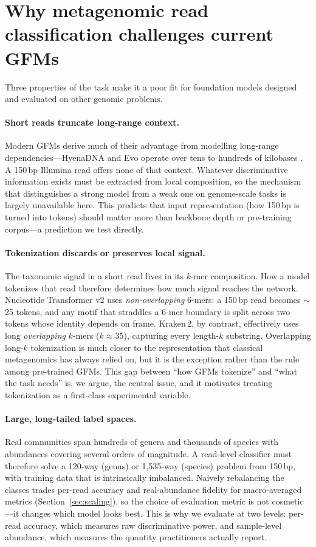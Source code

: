 \section{Why metagenomic read classification challenges current GFMs}
\label{sec:challenges}

Three properties of the task make it a poor fit for foundation models designed
and evaluated on other genomic problems.

\paragraph{Short reads truncate long-range context.}
Modern GFMs derive much of their advantage from modelling long-range
dependencies---HyenaDNA and Evo operate over tens to hundreds of kilobases
\citep{Nguyen2023hyena,Nguyen2024,Brixi2025}. A 150\,bp Illumina read offers
none of that context. Whatever discriminative information exists must be
extracted from local composition, so the mechanism that distinguishes a strong
model from a weak one on genome-scale tasks is largely unavailable here. This
predicts that input representation (how 150\,bp is turned into tokens) should
matter more than backbone depth or pre-training corpus---a prediction we test
directly.

\paragraph{Tokenization discards or preserves local signal.}
The taxonomic signal in a short read lives in its $k$-mer composition. How a
model tokenizes that read therefore determines how much signal reaches the
network. Nucleotide Transformer v2 uses \emph{non-overlapping} 6-mers: a
150\,bp read becomes $\sim$25 tokens, and any motif that straddles a 6-mer
boundary is split across two tokens whose identity depends on frame. Kraken\,2,
by contrast, effectively uses long \emph{overlapping} $k$-mers ($k\approx 35$),
capturing every length-$k$ substring. Overlapping long-$k$ tokenization is much
closer to the representation that classical metagenomics has always relied on,
but it is the exception rather than the rule among pre-trained GFMs. This gap
between ``how GFMs tokenize'' and ``what the task needs'' is, we argue, the
central issue, and it motivates treating tokenization as a first-class
experimental variable.

\paragraph{Large, long-tailed label spaces.}
Real communities span hundreds of genera and thousands of species with
abundances covering several orders of magnitude. A read-level classifier must
therefore solve a 120-way (genus) or 1{,}535-way (species) problem from 150\,bp,
with training data that is intrinsically imbalanced. Naively rebalancing the
classes trades per-read accuracy and real-abundance fidelity for macro-averaged
metrics (Section~\ref{sec:scaling}), so the choice of evaluation metric is not
cosmetic---it changes which model looks best. This is why we evaluate at two
levels: per-read accuracy, which measures raw discriminative power, and
sample-level abundance, which measures the quantity practitioners actually
report.

